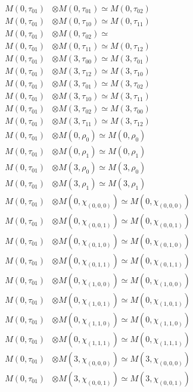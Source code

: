 \begin{align*}
M(0,\tau_{01}) &\otimes M(0,\tau_{01}) \simeq M(0,\tau_{02}) \\
M(0,\tau_{01}) &\otimes M(0,\tau_{10}) \simeq M(0,\tau_{11}) \\
M(0,\tau_{01}) &\otimes M(0,\tau_{02}) \simeq  \\
M(0,\tau_{01}) &\otimes M(0,\tau_{11}) \simeq M(0,\tau_{12}) \\
M(0,\tau_{01}) &\otimes M(3,\tau_{00}) \simeq M(3,\tau_{01}) \\
M(0,\tau_{01}) &\otimes M(3,\tau_{12}) \simeq M(3,\tau_{10}) \\
M(0,\tau_{01}) &\otimes M(3,\tau_{01}) \simeq M(3,\tau_{02}) \\
M(0,\tau_{01}) &\otimes M(3,\tau_{10}) \simeq M(3,\tau_{11}) \\
M(0,\tau_{01}) &\otimes M(3,\tau_{02}) \simeq M(3,\tau_{00}) \\
M(0,\tau_{01}) &\otimes M(3,\tau_{11}) \simeq M(3,\tau_{12}) \\
M(0,\tau_{01}) &\otimes M(0,\rho_{0}) \simeq M(0,\rho_{0}) \\
M(0,\tau_{01}) &\otimes M(0,\rho_{1}) \simeq M(0,\rho_{1}) \\
M(0,\tau_{01}) &\otimes M(3,\rho_{0}) \simeq M(3,\rho_{0}) \\
M(0,\tau_{01}) &\otimes M(3,\rho_{1}) \simeq M(3,\rho_{1}) \\
M(0,\tau_{01}) &\otimes M(0,\chi_{(0,0,0)}) \simeq M(0,\chi_{(0,0,0)}) \\
M(0,\tau_{01}) &\otimes M(0,\chi_{(0,0,1)}) \simeq M(0,\chi_{(0,0,1)}) \\
M(0,\tau_{01}) &\otimes M(0,\chi_{(0,1,0)}) \simeq M(0,\chi_{(0,1,0)}) \\
M(0,\tau_{01}) &\otimes M(0,\chi_{(0,1,1)}) \simeq M(0,\chi_{(0,1,1)}) \\
M(0,\tau_{01}) &\otimes M(0,\chi_{(1,0,0)}) \simeq M(0,\chi_{(1,0,0)}) \\
M(0,\tau_{01}) &\otimes M(0,\chi_{(1,0,1)}) \simeq M(0,\chi_{(1,0,1)}) \\
M(0,\tau_{01}) &\otimes M(0,\chi_{(1,1,0)}) \simeq M(0,\chi_{(1,1,0)}) \\
M(0,\tau_{01}) &\otimes M(0,\chi_{(1,1,1)}) \simeq M(0,\chi_{(1,1,1)}) \\
M(0,\tau_{01}) &\otimes M(3,\chi_{(0,0,0)}) \simeq M(3,\chi_{(0,0,0)}) \\
M(0,\tau_{01}) &\otimes M(3,\chi_{(0,0,1)}) \simeq M(3,\chi_{(0,0,1)}) \\

\end{align*}
